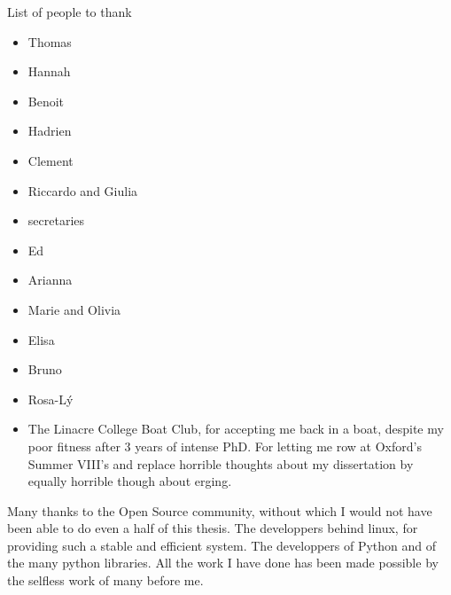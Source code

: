 List of people to thank

\begin{itemize}
	\item Thomas
	\item Hannah
	\item Benoit
        \item Hadrien
        \item Clement
	\item Riccardo and Giulia
	\item secretaries
	\item Ed
	\item Arianna
	\item Marie and Olivia
	\item Elisa
	\item Bruno
	\item Rosa-L\'y
        \item The Linacre College Boat Club, for accepting me back in a boat,
            despite my poor fitness after $3$ years of intense PhD. For letting
            me row at Oxford's Summer VIII's and replace horrible thoughts about
            my dissertation by equally horrible though about erging.
\end{itemize}

\noindent Many thanks to the Open Source community, without which I would not
have been able to do even a half of this thesis. The developpers behind linux,
for providing such a stable and efficient system. The developpers of Python and
of the many python libraries. All the work I have done has been made possible by
the selfless work of many before me.


\endgroup
